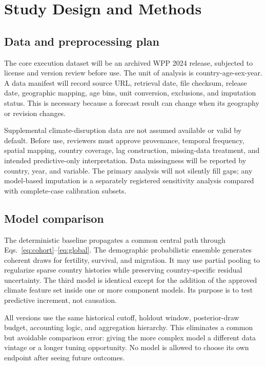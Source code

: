 \documentclass[conference]{IEEEtran}
\begin{document}
\section{Study Design and Methods}

\subsection{Data and preprocessing plan}

The core execution dataset will be an archived WPP 2024 release, subjected to license and version review before use. The unit of analysis is country-age-sex-year. A data manifest will record source URL, retrieval date, file checksum, release date, geographic mapping, age bins, unit conversion, exclusions, and imputation status. This is necessary because a forecast result can change when its geography or revision changes.

Supplemental climate-disruption data are not assumed available or valid by default. Before use, reviewers must approve provenance, temporal frequency, spatial mapping, country coverage, lag construction, missing-data treatment, and intended predictive-only interpretation. Data missingness will be reported by country, year, and variable. The primary analysis will not silently fill gaps; any model-based imputation is a separately registered sensitivity analysis compared with complete-case calibration subsets.

\subsection{Model comparison}

The deterministic baseline propagates a common central path through Eqs.~\eqref{eq:cohort}--\eqref{eq:global}. The demographic probabilistic ensemble generates coherent draws for fertility, survival, and migration. It may use partial pooling to regularize sparse country histories while preserving country-specific residual uncertainty. The third model is identical except for the addition of the approved climate feature set inside one or more component models. Its purpose is to test predictive increment, not causation.

All versions use the same historical cutoff, holdout window, posterior-draw budget, accounting logic, and aggregation hierarchy. This eliminates a common but avoidable comparison error: giving the more complex model a different data vintage or a longer tuning opportunity. No model is allowed to choose its own endpoint after seeing future outcomes.
\end{document}
